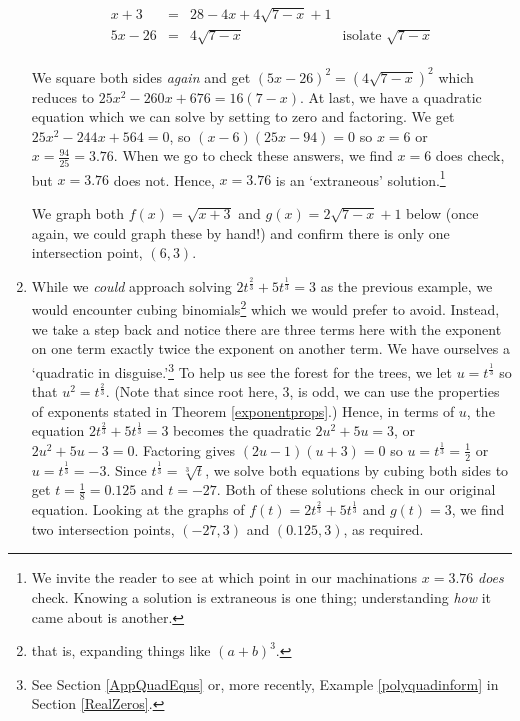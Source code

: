 \documentclass{ximera}
\begin{document}
\begin{example}
\begin{enumerate}
\[\begin{array}{rclr}
 x+3 & = & 28-4x+4\sqrt{7-x} + 1 & \\
 
 5x-26 & = & 4\sqrt{7-x} & \text{isolate $\sqrt{7-x}$} \\ \end{array} \]
 
We square both sides \textit{again} and get $(5x-26)^2 = (4\sqrt{7-x})^2$ which reduces to $25x^2-260x+676 = 16(7-x)$. At last, we have a quadratic equation which we can solve by setting to zero and factoring.  We get  $25x^2-244x+564 = 0$, so $(x-6)(25x-94) = 0$ so $x = 6$ or $x = \frac{94}{25} = 3.76$.  When we go to check these answers, we find $x=6$ does check, but $x = 3.76$ does not. Hence, $x=3.76$ is an `extraneous' solution.\footnote{We invite the reader to see at which point in our machinations $x=3.76$ \textit{does} check.  Knowing a solution is extraneous is one thing;  understanding \textit{how} it came about is another.}

We graph both $f(x) = \sqrt{x+3}$ and $g(x) = 2\sqrt{7-x} + 1$ below (once again, we could graph these by hand!) and confirm there is only one intersection point, $(6,3)$.

\item  While we \textit{could} approach solving  $2t^{\frac{2}{3}} + 5t^{\frac{1}{3}} = 3$ as the previous example, we would encounter cubing binomials\footnote{that is, expanding things like $(a+b)^3$.} which we would prefer to avoid.  Instead, we take a step back and notice there are three terms here with the exponent on one term exactly twice the exponent on another term.  We have ourselves a `quadratic in disguise.'\footnote{See Section \ref{AppQuadEqus} or, more recently, Example \ref{polyquadinform} in Section \ref{RealZeros}.} To help us see the forest for the trees, we let $u = t^{\frac{1}{3}}$ so that $u^2 = t^{\frac{2}{3}}$. (Note that since root here, $3$, is odd, we can use the properties of exponents stated in Theorem \ref{exponentprops}.)  Hence, in terms of $u$, the equation   $2t^{\frac{2}{3}} + 5t^{\frac{1}{3}} = 3$ becomes the quadratic $2u^2 + 5u = 3$, or $2u^2 + 5u - 3 = 0$.  Factoring gives $(2u-1)(u+3) = 0$ so $u = t^{\frac{1}{3}} = \frac{1}{2}$ or $u = t^{\frac{1}{3}} = -3$.  Since $t^{\frac{1}{3}} = \sqrt[3]{t}$, we solve both equations by cubing both sides to get $t = \frac{1}{8} = 0.125$ and $t = -27$.  Both of these solutions check in our original equation.  Looking at the graphs of $f(t) = 2t^{\frac{2}{3}} + 5t^{\frac{1}{3}}$ and $g(t) = 3$, we find two intersection points, $(-27,3)$ and $(0.125,3)$, as required.


\end{enumerate}
\end{example}
\end{document}
